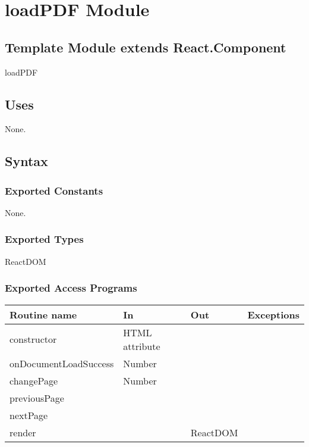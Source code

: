 \documentclass[12pt, titlepage]{article}
\begin{document}
\newpage

\section{loadPDF Module}

\subsection{Template Module extends React.Component}

loadPDF

\subsection{Uses}

None.

\subsection{Syntax}

\subsubsection{Exported Constants}

None.

\subsubsection{Exported Types}

ReactDOM

\subsubsection{Exported Access Programs}

\begin{tabular}{| l | l | l | l |}
  \hline
  \textbf{Routine name} & \textbf{In} & \textbf{Out} & \textbf{Exceptions}\\
  \hline
  constructor & HTML attribute & ~ & ~\\
  \hline
  onDocumentLoadSuccess & Number & ~ & ~\\
  \hline
  changePage & Number & ~ & ~\\
  \hline
  previousPage & ~ & ~ & ~\\
  \hline
  nextPage & ~ & ~ & ~\\
  \hline
  render & ~ & ReactDOM & ~\\
  \hline
\end{tabular}
\end{document}

